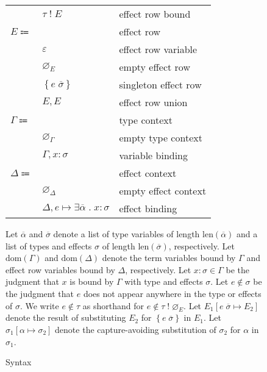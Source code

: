 \documentclass[12pt]{article}
\newcommand\parens[1]{\left( #1 \right)} %
\newcommand\lstof[1]{\overline{#1}}
\newcommand\lstlen[1]{\text{len}\parens{\lstof{#1}}}
\newcommand\evar{x}
\newcommand\ttype{\tau}
\newcommand\tvar{\alpha}
\newcommand\tx{\sigma}
\newcommand\twithx[2]{#1 \; ! \; #2} %
\newcommand\tanno[2]{#1 : #2} %
\newcommand\tsub[3]{#1 \left[ #2 \mapsto #3 \right]} %
\newcommand\xeffects{E}
\newcommand\xvar{\varepsilon}
\newcommand\xempty{\varnothing_{\xeffects}}
\newcommand\xtapp[2]{#1 \; \lstof{#2}}
\newcommand\xsingleton[1]{\left\{ #1 \right\}}
\newcommand\xunion[2]{#1, #2}
\newcommand\xeffect{e}
\newcommand\xnotint[2]{#1 \notin #2} %
\newcommand\xsub[3]{#1 \left[ #2 \mapsto #3 \right]} %
\newcommand\ccontext{\Gamma}
\newcommand\cempty{\varnothing_{\ccontext}}
\newcommand\cextend[2]{#1, #2}
\newcommand\cdom[1]{\text{dom}\parens{#1}}
\newcommand\dcontext{\Delta}
\newcommand\dempty{\varnothing_{\dcontext}}
\newcommand\dextend[2]{#1, #2}
\newcommand\deffect[4]{#1 \mapsto \exists #2 \; . \; \tanno{#3}{#4}} %
\newcommand\ddom[1]{\text{dom}\parens{#1}}
\begin{document}
\begin{figure}
\begin{mdframed}[backgroundcolor=none]
\begin{center}
\begin{tabular}{l l l}
          & $\twithx{\ttype}{\xeffects}$ & effect row bound \\
          $\xeffects \Coloneqq$ & & effect row \\
          & $\xvar$ & effect row variable \\
          & $\xempty$ & empty effect row \\
          & $\xsingleton{\xtapp{\xeffect}{\tx}}$ & singleton effect row \\
          & $\xunion{\xeffects}{\xeffects}$ & effect row union \\
          $\ccontext \Coloneqq$ & & type context \\
          & $\cempty$ & empty type context \\
          & $\cextend{\ccontext}{\tanno{\evar}{\tx}}$ & variable binding \\
          $\dcontext \Coloneqq$ & & effect context \\
          & $\dempty$ & empty effect context \\
          & $\dextend{\dcontext}{\deffect{\xeffect}{\lstof{\tvar}}{\evar}{\tx}}$ & effect binding \\
        \end{tabular}
      \end{center}

      \bigskip

      Let $\lstof{\tvar}$ and $\lstof{\tx}$ denote a list of type variables of length $\lstlen{\tvar}$ and a list of types and effects $\tx$ of length $\lstlen{\tx}$, respectively. Let $\cdom{\ccontext}$ and $\ddom{\dcontext}$ denote the term variables bound by $\ccontext$ and effect row variables bound by $\dcontext$, respectively. Let $\tanno{\evar}{\tx} \in \ccontext$ be the judgment that $\evar$ is bound by $\ccontext$ with type and effects $\tx$. Let $\xnotint{\xeffect}{\tx}$ be the judgment that $\xeffect$ does not appear anywhere in the type or effects of $\tx$. We write $\xnotint{\xeffect}{\ttype}$ as shorthand for $\xnotint{\xeffect}{\twithx{\ttype}{\xempty}}$. Let $\xsub{\xeffects_1}{\xtapp{\xeffect}{\tx}}{\xeffects_2}$ denote the result of substituting $\xeffects_2$ for $\xsingleton{\xtapp{\xeffect}{\tx}}$ in $\xeffects_1$. Let $\tsub{\tx_1}{\tvar}{\tx_2}$ denote the capture-avoiding substitution of $\tx_2$ for $\tvar$ in $\tx_1$.

      \caption{Syntax}\label{fig:syntax}
    \end{mdframed}
  \end{figure}
\end{document}
